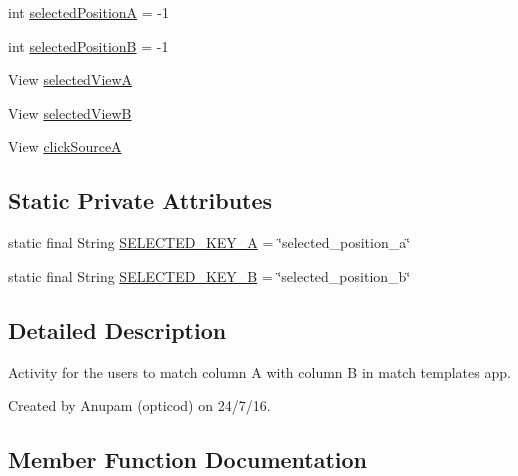 \begin{DoxyCompactItemize}
\item 
int \hyperlink{classorg_1_1buildmlearn_1_1matchtemplate_1_1fragment_1_1MainActivityFragment_ac0fdba1133919b41ca8da40941917978}{selected\+PositionA} = -\/1
\item 
int \hyperlink{classorg_1_1buildmlearn_1_1matchtemplate_1_1fragment_1_1MainActivityFragment_a667c37f2984f5d6c44605c965d64bb83}{selected\+PositionB} = -\/1
\item 
View \hyperlink{classorg_1_1buildmlearn_1_1matchtemplate_1_1fragment_1_1MainActivityFragment_a858269b16f4e5664d3e29d3028cf4cdc}{selected\+ViewA}
\item 
View \hyperlink{classorg_1_1buildmlearn_1_1matchtemplate_1_1fragment_1_1MainActivityFragment_a670f583dfa426ca1b7d740ba74a08c6c}{selected\+ViewB}
\item 
View \hyperlink{classorg_1_1buildmlearn_1_1matchtemplate_1_1fragment_1_1MainActivityFragment_a4163eaa188e80f314559a9279475eda4}{click\+SourceA}
\end{DoxyCompactItemize}
\subsection*{Static Private Attributes}
\begin{DoxyCompactItemize}
\item 
static final String \hyperlink{classorg_1_1buildmlearn_1_1matchtemplate_1_1fragment_1_1MainActivityFragment_a2a8a0a831b4c91b42cbda57739e9c59b}{S\+E\+L\+E\+C\+T\+E\+D\+\_\+\+K\+E\+Y\+\_\+A} = \char`\"{}selected\+\_\+position\+\_\+a\char`\"{}
\item 
static final String \hyperlink{classorg_1_1buildmlearn_1_1matchtemplate_1_1fragment_1_1MainActivityFragment_ac3db1fca5c88fa47a82d6df8e34347d7}{S\+E\+L\+E\+C\+T\+E\+D\+\_\+\+K\+E\+Y\+\_\+B} = \char`\"{}selected\+\_\+position\+\_\+b\char`\"{}
\end{DoxyCompactItemize}


\subsection{Detailed Description}
Activity for the users to match column A with column B in match template\textquotesingle{}s app. 

Created by Anupam (opticod) on 24/7/16. 

\subsection{Member Function Documentation}
